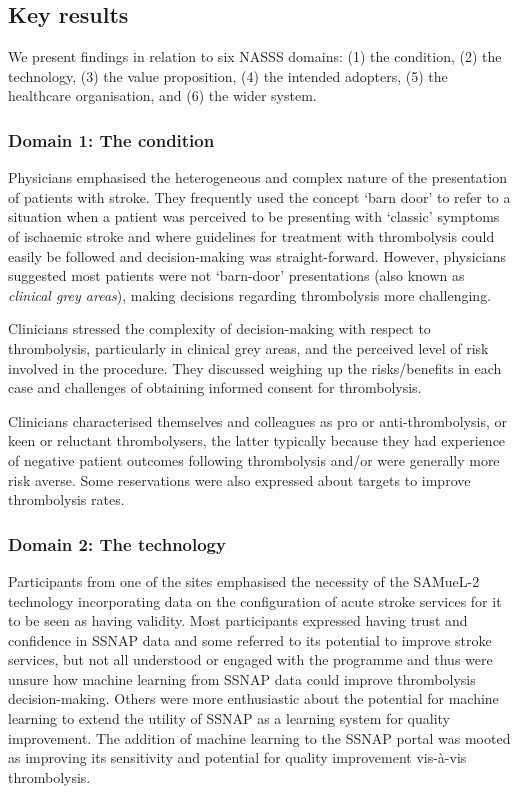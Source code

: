 \subsection{Key results}

We present findings in relation to six NASSS domains: (1) the condition, (2) the technology, (3) the value proposition, (4) the intended adopters, (5) the healthcare organisation, and (6) the wider system.

\subsubsection{Domain 1: The condition}

Physicians emphasised the heterogeneous and complex nature of the presentation of patients with stroke. They frequently used the concept ‘barn door’ to refer to a situation when a patient was perceived to be presenting with ‘classic’ symptoms of ischaemic stroke and where guidelines for treatment with thrombolysis could easily be followed and decision-making was straight-forward. However, physicians suggested most patients were not ‘barn-door’ presentations (also known as \textit{clinical grey areas}), making decisions regarding thrombolysis more challenging.

Clinicians stressed the complexity of decision-making with respect to thrombolysis, particularly in clinical grey areas, and the perceived level of risk involved in the procedure. They discussed weighing up the risks/benefits in each case and challenges of obtaining informed consent for thrombolysis.

Clinicians characterised themselves and colleagues as pro or anti-thrombolysis, or keen or reluctant thrombolysers, the latter typically because they had experience of negative patient outcomes following thrombolysis and/or were generally more risk averse. Some reservations were also expressed about targets to improve thrombolysis rates.

\subsubsection{Domain 2: The technology}

Participants from one of the sites emphasised the necessity of the SAMueL-2 technology incorporating data on the configuration of acute stroke services for it to be seen as having validity. Most participants expressed having trust and confidence in SSNAP data and some referred to its potential to improve stroke services, but not all understood or engaged with the programme and thus were unsure how machine learning from SSNAP data could improve thrombolysis decision-making. Others were more enthusiastic about the potential for machine learning to extend the utility of SSNAP as a learning system for quality improvement. The addition of machine learning to the SSNAP portal was mooted as improving its sensitivity and potential for quality improvement vis-à-vis thrombolysis.

